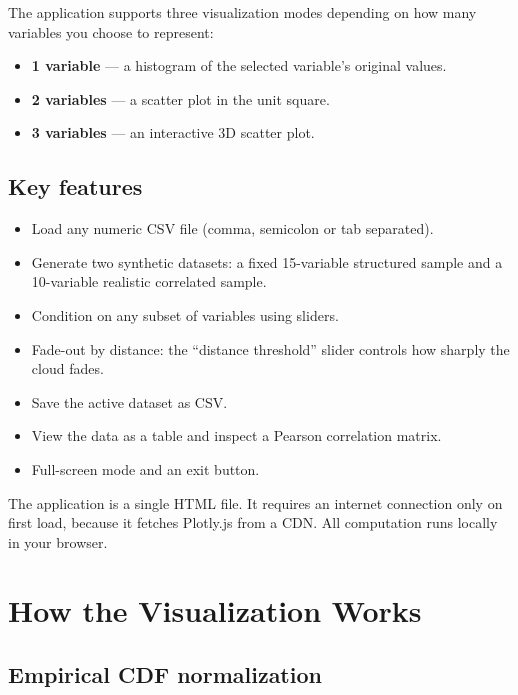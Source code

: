 \documentclass[11pt,a4paper]{article}
\begin{document}
The application supports three visualization modes depending on how many variables you choose to represent:

\begin{itemize}[leftmargin=1.4em]
  \item \textbf{1 variable} --- a histogram of the selected variable's original values.
  \item \textbf{2 variables} --- a scatter plot in the unit square.
  \item \textbf{3 variables} --- an interactive 3D scatter plot.
\end{itemize}

\subsection{Key features}

\begin{itemize}[leftmargin=1.4em]
  \item Load any numeric CSV file (comma, semicolon or tab separated).
  \item Generate two synthetic datasets: a fixed 15-variable structured sample and a 10-variable realistic correlated sample.
  \item Condition on any subset of variables using sliders.
  \item Fade-out by distance: the ``distance threshold'' slider controls how sharply the cloud fades.
  \item Save the active dataset as CSV.
  \item View the data as a table and inspect a Pearson correlation matrix.
  \item Full-screen mode and an exit button.
\end{itemize}

\begin{notebox}
The application is a single HTML file. It requires an internet connection only on first load, because it fetches Plotly.js from a CDN. All computation runs locally in your browser.
\end{notebox}

\section{How the Visualization Works}

\subsection{Empirical CDF normalization}
\end{document}
